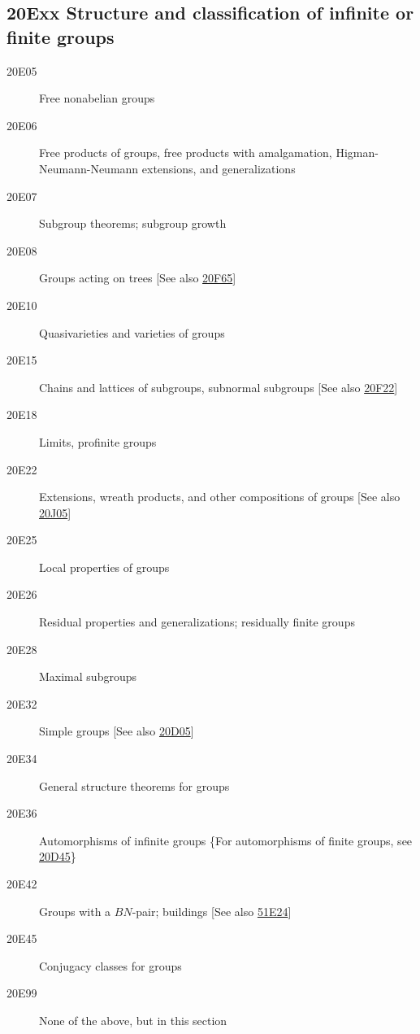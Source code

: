 \documentclass[letterpaper]{article}
\begin{document}
\subsection*{20Exx  Structure and classification of infinite or finite groups}\label{20Exx}
\begin{description}  
\item [20E05]\label{20E05} Free nonabelian groups
\item [20E06]\label{20E06} Free products of groups, free products with amalgamation, Higman-Neumann-Neumann extensions, and generalizations
\item [20E07]\label{20E07} Subgroup theorems; subgroup growth
\item [20E08]\label{20E08} Groups acting on trees [See also \hyperref[20F65]{20F65}]
\item [20E10]\label{20E10} Quasivarieties and varieties of groups
\item [20E15]\label{20E15} Chains and lattices of subgroups, subnormal subgroups [See also \hyperref[20F22]{20F22}]
\item [20E18]\label{20E18} Limits, profinite groups
\item [20E22]\label{20E22} Extensions, wreath products, and other compositions of groups [See also \hyperref[20J05]{20J05}]
\item [20E25]\label{20E25} Local properties of groups
\item [20E26]\label{20E26} Residual properties and generalizations; residually finite groups
\item [20E28]\label{20E28} Maximal subgroups
\item [20E32]\label{20E32} Simple groups [See also \hyperref[20D05]{20D05}]
\item [20E34]\label{20E34} General structure theorems for groups
\item [20E36]\label{20E36} Automorphisms of infinite groups \{For automorphisms of finite groups, see \hyperref[20D45]{20D45}\}
\item [20E42]\label{20E42} Groups with a $BN$-pair; buildings [See also \hyperref[51E24]{51E24}]
\item [20E45]\label{20E45} Conjugacy classes for groups
\item [20E99]\label{20E99} None of the above, but in this section
\end{description}
\end{document}
